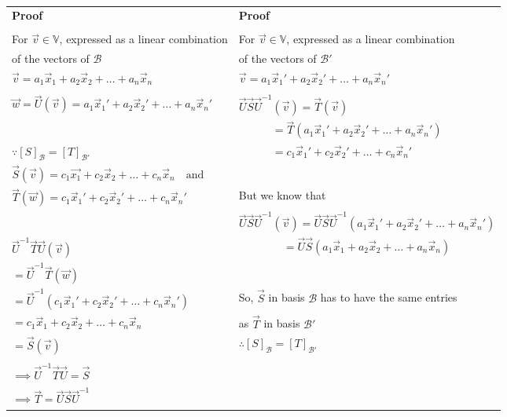 \documentclass[journal,12pt,twocolumn]{IEEEtran}
\begin{document}
\begin{table*}[h!]
\begin{center}
\begin{tabular}{|l|l|}
\textbf{Proof}&\textbf{Proof}\\
 & \\
For $\vec{v} \in \mathbb V$, expressed as a linear combination &
For $\vec{v} \in \mathbb V$, expressed as a linear combination\\
of the vectors of $\mathcal{B}$ &
of the vectors of $\mathcal{B'}$\\
$\vec{v} = a_1\vec{x}_1 + a_2\vec{x}_2 + \ldots + a_n\vec{x}_n$ &
$\vec{v} = a_1\vec{x}_1' + a_2\vec{x}_2' + \ldots + a_n\vec{x}_n'$\\
 & \\
$\vec{w} = \vec{U}(\vec{v}) = a_1\vec{x}_1' + a_2\vec{x}_2' + \ldots + a_n\vec{x}_n'$ &
$\vec{U}\vec{S}\vec{U}^{-1}(\vec{v}) = \vec{T}(\vec{v})$\\
 & $\quad\quad\quad= \vec{T}(a_1\vec{x}_1' + a_2\vec{x}_2' + \ldots + a_n\vec{x}_n')$\\
$\because [S]_\mathcal{B} = [T]_\mathcal{B'}$ &
$\quad\quad\quad= c_1\vec{x}_1' + c_2\vec{x}_2' + \ldots + c_n\vec{x}_n'$\\
$\vec{S}(\vec{v}) = c_1\vec{x_1} + c_2\vec{x}_2 + \ldots + c_n\vec{x}_n\quad\text{and}$ & \\
$\vec{T}(\vec{w}) = c_1\vec{x}_1' + c_2\vec{x}_2' + \ldots + c_n\vec{x}_n'$ &
But we know that\\
 & $\vec{U}\vec{S}\vec{U}^{-1}(\vec{v}) = \vec{U}\vec{S}\vec{U}^{-1}(a_1\vec{x}_1' + a_2\vec{x}_2' + \ldots + a_n\vec{x}_n')$\\
$\vec{U}^{-1}\vec{T}\vec{U}(\vec{v})$ &
$\quad\quad\quad\quad= \vec{U}\vec{S}(a_1\vec{x}_1+a_2\vec{x}_2+\ldots+a_n\vec{x}_n)$\\
$=\vec{U}^{-1}\vec{T}(\vec{w})$ & \\
$=\vec{U}^{-1}(c_1\vec{x}_1' + c_2\vec{x}_2' + \ldots + c_n\vec{x}_n')$ &
So, $\vec{S}$ in basis $\mathcal{B}$ has to have the same entries\\
$= c_1\vec{x}_1 + c_2\vec{x}_2 + \ldots + c_n\vec{x}_n$ &
as $\vec{T}$ in basis $\mathcal{B'}$\\
$=\vec{S}(\vec{v})$ & $\therefore [S]_\mathcal{B} = [T]_\mathcal{B'}$\\
 & \\
$\implies\vec{U}^{-1}\vec{T}\vec{U} = \vec{S}$ & \\
$\implies \vec{T} = \vec{U}\vec{S}\vec{U}^{-1}$ & \\[0.5ex] \hline
\end{tabular}
\caption{}
\label{table:1}
\end{center}
\vspace{-0.5cm}
\end{table*}
\end{document}
